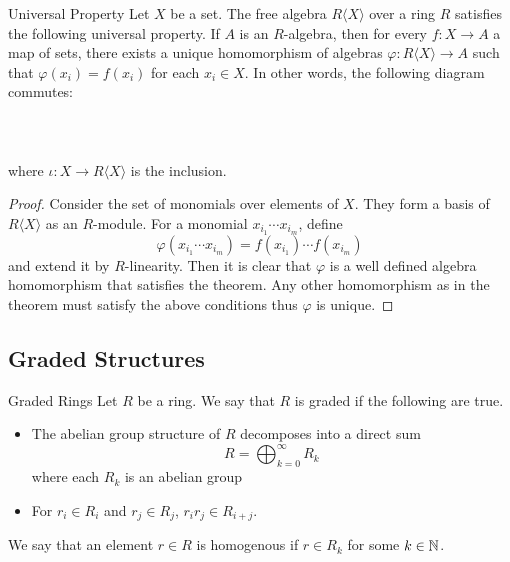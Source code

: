 \documentclass[a4paper]{article}
\begin{document}
\begin{prp}{Universal Property}{} Let $X$ be a set. The free algebra $R\langle X\rangle$ over a ring $R$ satisfies the following universal property. If $A$ is an $R$-algebra, then for every $f:X\to A$ a map of sets, there exists a unique homomorphism of algebras $\varphi:R\langle X\rangle\to A$ such that $\varphi(x_i)=f(x_i)$ for each $x_i\in X$. In other words, the following diagram commutes: \\~\\
\\~\\
where $\iota:X\to R\langle X\rangle$ is the inclusion. \tcbline
\begin{proof}
Consider the set of monomials over elements of $X$. They form a basis of $R\langle X\rangle$ as an $R$-module. For a monomial $x_{i_1}\cdots x_{i_m}$, define $$\varphi(x_{i_1}\cdots x_{i_m})=f(x_{i_1})\cdots f(x_{i_m})$$ and extend it by $R$-linearity. Then it is clear that $\varphi$ is a well defined algebra homomorphism that satisfies the theorem. Any other homomorphism as in the theorem must satisfy the above conditions thus $\varphi$ is unique. 
\end{proof}
\end{prp}

\subsection{Graded Structures}
\begin{defn}{Graded Rings}{} Let $R$ be a ring. We say that $R$ is graded if the following are true. 
\begin{itemize}
\item The abelian group structure of $R$ decomposes into a direct sum $$R=\bigoplus_{k=0}^\infty R_k$$ where each $R_k$ is an abelian group 
\item For $r_i\in R_i$ and $r_j\in R_j$, $r_ir_j\in R_{i+j}$. 
\end{itemize}
We say that an element $r\in R$ is homogenous if $r\in R_k$ for some $k\in\mathbb{N}$. 
\end{defn}
\end{document}
